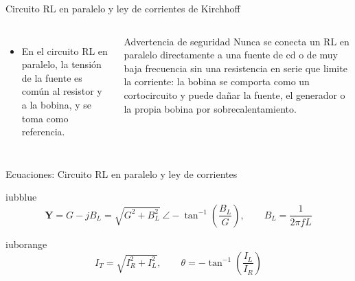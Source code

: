 \documentclass[aspectratio=169,11pt,xcolor={table}]{beamer}
\begin{document}
\begin{frame}{{\normalsize Circuito RL en paralelo y ley de corrientes de Kirchhoff}}
\begin{columns}[c,onlytextwidth]
\small
\begin{itemize}\setlength{\itemsep}{4pt}
  \item En el circuito RL en paralelo, la tensión de la fuente es común al resistor y a la bobina, y se toma como referencia.
\end{itemize}
\begin{cardO}{Advertencia de seguridad}
\footnotesize Nunca se conecta un RL en paralelo directamente a una fuente de cd o de muy baja frecuencia sin una resistencia en serie que limite la corriente: la bobina se comporta como un cortocircuito y puede dañar la fuente, el generador o la propia bobina por sobrecalentamiento.
\end{cardO}
\end{columns}
\end{frame}

\begin{frame}{{\normalsize Ecuaciones: Circuito RL en paralelo y ley de corrientes}}
\begin{cajaplana}{iubblue}
\centering
{\large
\begin{equation*}
  \mathbf{Y} = G - jB_L = \sqrt{G^{2} + B_L^{2}}\ \angle -\tan^{-1}\!\left(\frac{B_L}{G}\right), \qquad B_L = \frac{1}{2\pi f L}
\end{equation*}
}
\end{cajaplana}
\vspace{1mm}
\begin{cajaplana}{iuborange}
\centering
{\large
\begin{equation*}
  I_T = \sqrt{I_R^{2} + I_L^{2}}, \qquad \theta = -\tan^{-1}\!\left(\frac{I_L}{I_R}\right)
\end{equation*}
}
\end{cajaplana}
\end{frame}
\end{document}
